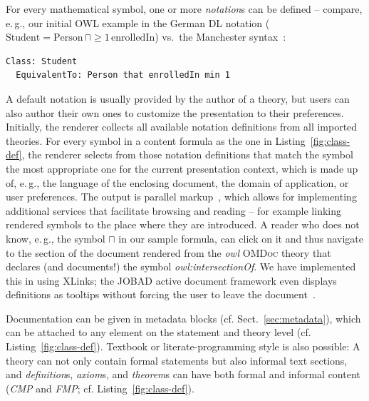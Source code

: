 \documentclass{llncs}
\renewcommand{\omdoc}{\textsc{OMDoc}\xspace}
\begin{document}
\fi For every mathematical symbol, one or more \emph{notation}s can be defined -- compare,
e.\,g., our initial OWL example in the German DL notation
($\text{Student}=\text{Person}\,\sqcap\ge 1\,\text{enrolledIn}$) vs.\ the Manchester
syntax~\cite{w3c:owl2-manchester}:
\begin{lstlisting}[language={}]
Class: Student
  EquivalentTo: Person that enrolledIn min 1
\end{lstlisting}
A default notation is usually provided by the author of a theory, but users can also
author their own ones to customize the presentation to their preferences.  Initially, the
renderer collects all available notation definitions from all imported theories.  For
every symbol in a content formula as the one in Listing~\ref{fig:class-def}, the renderer
selects from those notation definitions that match the symbol the most appropriate one for
the current presentation context, which is made up of, e.\,g., the language of the
enclosing document, the domain of application, or user preferences.  The output is
parallel markup~\cite[section~5.4]{MathML3:webpage}, which allows for implementing
additional services that facilitate browsing and reading -- for example linking rendered
symbols to the place where they are introduced.  A reader who does not know, e.\,g., the
symbol $\sqcap$ in our sample formula, can click on it and thus navigate to the section of
the document rendered from the \textit{owl} \omdoc theory that declares (and documents!)
the symbol \textit{owl:intersectionOf}.  We have implemented this in {\swim} using XLinks;
the JOBAD active document framework even displays definitions as tooltips without forcing
the user to leave the document~\cite{GLR:WebSvcActMathDoc09}. {\ifpublic\else

\fi} Documentation can be given in metadata blocks (cf. Sect.~\ref{sec:metadata}), which
can be attached to any element on the statement and theory level
(cf. Listing~\ref{fig:class-def}).  Textbook or literate-programming style is also
possible: A theory can not only contain formal statements but also informal text sections,
and \textit{definition}s, \textit{axiom}s, and \textit{theorem}s can have both formal and
informal content (\textit{CMP} and \textit{FMP}; cf. Listing~\ref{fig:class-def}).
\end{document}
